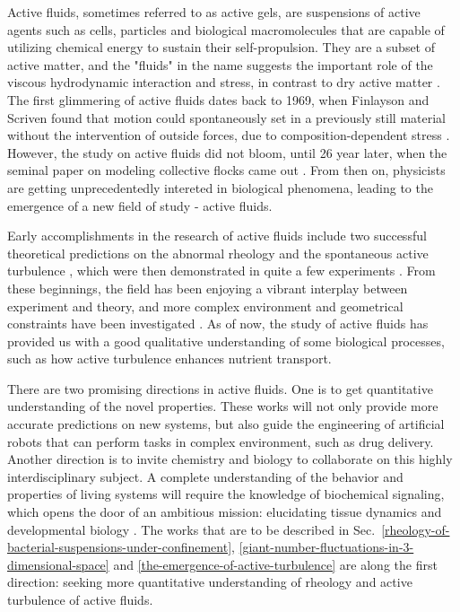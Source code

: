 Active fluids, sometimes referred to as active gels, are suspensions of active agents such as cells, particles and biological macromolecules that are capable of utilizing chemical energy to sustain their self-propulsion. They are a subset of active matter, and the "fluids" in the name suggests the important role of the viscous hydrodynamic interaction and stress, in contrast to dry active matter \cite{Marchetti2013}. The first glimmering of active fluids dates back to 1969, when Finlayson and Scriven found that motion could spontaneously set in a previously still material without the intervention of outside forces, due to composition-dependent stress \cite{Finlayson1969}. However, the study on active fluids did not bloom, until 26 year later, when the seminal paper on modeling collective flocks came out \cite{Vicsek1995}. From then on, physicists are getting unprecedentedly intereted in biological phenomena, leading to the emergence of a new field of study - active fluids.

Early accomplishments in the research of active fluids include two successful theoretical predictions on the abnormal rheology and the spontaneous active turbulence \cite{Hatwalne2004, Simha2002}, which were then demonstrated in quite a few experiments
\cite{Dombrowski2004, Wensink2012, Rafai2010, Sokolov2009, Gachelin2013, Lopez2015}. From these beginnings, the field has been enjoying a vibrant interplay between experiment and theory, and more complex environment and geometrical constraints have been investigated \cite{Ramaswamy2019}. As of now, the study of active fluids has provided us with a good qualitative understanding of some biological processes, such as how active turbulence enhances nutrient transport.

There are two promising directions in active fluids. One is to get quantitative understanding of the novel properties.  These works will not only provide more accurate predictions on new systems, but also guide the engineering of artificial robots that can perform tasks in complex environment, such as drug delivery. Another direction is to invite chemistry and biology to collaborate on this highly interdisciplinary subject. A complete understanding of the behavior and properties of living systems will require the knowledge of biochemical signaling, which opens the door of an ambitious mission: elucidating tissue dynamics and developmental biology \cite{Marchetti2013, Curatolo2020}. The works that are to be described in Sec.~\ref{rheology-of-bacterial-suspensions-under-confinement},
\ref{giant-number-fluctuations-in-3-dimensional-space} and \ref{the-emergence-of-active-turbulence} are along the first direction: seeking more quantitative understanding of rheology and active turbulence of active fluids.




